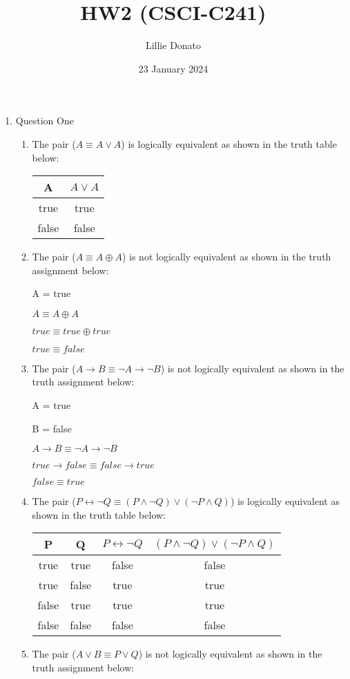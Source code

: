 \documentclass{article}
\title{HW2 (CSCI-C241)}
\author{Lillie Donato}
\date{23 January 2024}
\begin{document}
\maketitle

\begin{enumerate}
    \item Question One
    \begin{enumerate}
        \item The pair ($A \equiv A \lor A$) is logically equivalent as shown in the truth table below:
        
        \begin{tabular}{| c | c |}
            \hline
            A & $A \lor A$ \\
            \hline
            true & true \\
            \hline
            false & false \\
            \hline
        \end{tabular}
        \item The pair ($A \equiv A \oplus A$) is not logically equivalent as shown in the truth assignment below:
        
        A = true
        
        $A \equiv A \oplus A$

        $true \equiv true \oplus true$

        $true \equiv false$
        \item The pair ($A \rightarrow B \equiv \neg A \rightarrow \neg B$) is not logically equivalent as shown in the truth assignment below:
        
        A = true
        
        B = false

        $A \rightarrow B \equiv \neg A \rightarrow \neg B$

        $true \rightarrow false \equiv false \rightarrow true$

        $false \equiv true$
        \item The pair ($P \leftrightarrow \neg Q \equiv (P \land \neg Q) \lor (\neg P \land Q)$) is logically equivalent as shown in the truth table below:
        
        \begin{tabular}{| c | c | c | c |}
            \hline
            P & Q & $P \leftrightarrow \neg Q$ & $(P \land \neg Q) \lor (\neg P \land Q)$ \\
            \hline
            true & true & false & false \\
            \hline
            true & false & true & true \\
            \hline
            false & true & true & true \\
            \hline
            false & false & false & false \\
            \hline
        \end{tabular}
        \item
        The pair ($A \lor B \equiv P \lor Q$) is not logically equivalent as shown in the truth assignment below:


\end{enumerate}
\end{enumerate}
\end{document}
